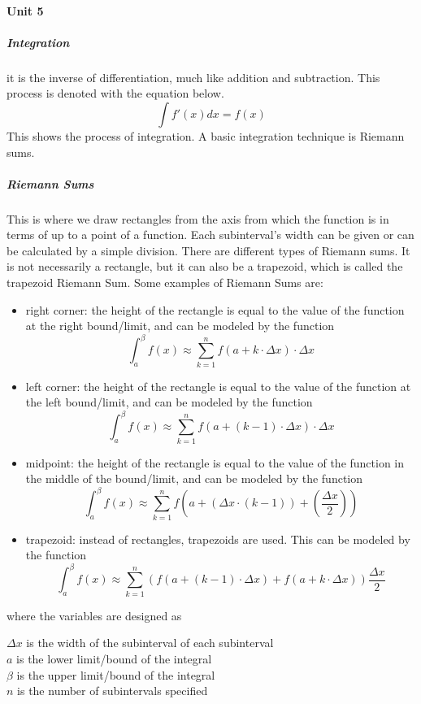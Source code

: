 \documentclass{article} %
\theoremstyle{theorem}
\theoremstyle{definition}
\begin{document}
            \paragraph{Unit 5}
                \subparagraph{Integration}
                    it is the inverse of differentiation, much like addition and subtraction. This process is denoted with the equation below.
                    $$\int f'(x)dx = f(x)$$
                    This shows the process of integration. A basic integration technique is Riemann sums.
                \subparagraph{Riemann Sums}
                    This is where we draw rectangles from the axis from which the function is in terms of up to a point of a function. Each subinterval's width can be given or can be calculated by a simple division. There are different types of Riemann sums.
                    It is not necessarily a rectangle, but it can also be a trapezoid, which is called the trapezoid Riemann Sum.
                    Some examples of Riemann Sums are:
                    \begin{itemize}
                        \item right corner: the height of the rectangle is equal to the value of the function at the right bound/limit, and can be modeled by the function $$\int_a^\beta f(x)\approx \sum_{k=1}^{n}f(a+k \cdot \Delta x)\cdot\Delta x$$
                        \item left corner: the height of the rectangle is equal to the value of the function at the left bound/limit, and can be modeled by the function $$\int_a^\beta f(x) \approx \sum_{k=1}^{n}f(a+(k-1)\cdot \Delta x)\cdot\Delta x$$
                        \item midpoint: the height of the rectangle is equal to the value of the function in the middle of the bound/limit, and can be modeled by the function $$\int_a^\beta f(x)\approx \sum_{k=1}^{n}f(a+(\Delta x\cdot(k-1))+(\frac{\Delta x}{2}))$$
                    \item trapezoid: instead of rectangles, trapezoids are used. This can be modeled by the function $$\int_a^\beta f(x)\approx \sum_{k=1}^{n}(f(a+(k-1)\cdot\Delta x)+f(a+k\cdot\Delta x))\frac{\Delta x}{2}$$
                    \end{itemize}
                    where the variables are designed as
                    \begin{center}
                        $\Delta x$ is the width of the subinterval of each subinterval\\
                        $a$ is the lower limit/bound of the integral\\
                        $\beta$ is the upper limit/bound of the integral\\
                        $n$ is the number of subintervals specified\\
                    \end{center}
\end{document}
